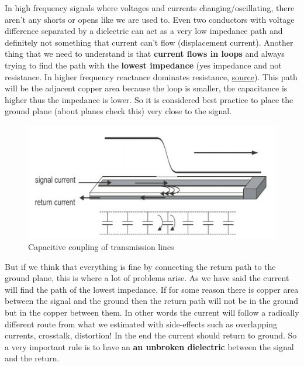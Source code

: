\documentclass[final]{cubedoc}
\begin{document}
	
	In high frequency signals where voltages and currents changing/oscillating, there aren't any shorts or opens like we are used to. Even two conductors with voltage difference separated by a dielectric can act as a very low impedance path and definitely not something that current can't flow (displacement current). Another thing that we need to understand is that \textbf{current flows in loops} and always trying to find the path with the \textbf{lowest impedance} (yes impedance and not resistance. In higher frequency reactance dominates resistance, \href{https://learnemc.com/pcb-layout}{source}). This path will be the adjacent copper area because the loop is smaller, the capacitance is higher thus the impedance is lower. So it is considered best practice to place the ground plane (about planes check this) very close to the signal.
	
	\begin{figure}[h!]
		\centering
		\includegraphics[keepaspectratio, width=\textwidth, height=.2\textheight]{assets/signal_return.png}
		\caption{Capacitive coupling of transmission lines \cite{bogatin2009signal}}
	\end{figure}
	
	But if we think that everything is fine by connecting the return path to the ground plane, this is where a lot of problems arise. As we have said the current will find the path of the lowest impedance. If for some reason there is copper area between the signal and the ground then the return path will not be in the ground but in the copper between them. In other words the current will follow a radically different route from what we estimated with side-effects such as overlapping currents, crosstalk, distortion! In the end the current should return to ground. So a very important rule is to have an \textbf{an unbroken dielectric} between the signal and the return. 
	
\end{document}
